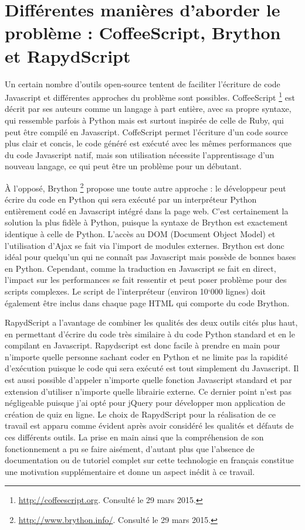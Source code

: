 \documentclass[a4paper,11pt,openany,oneside]{sphinxmanual}
\begin{document}
\section{Différentes manières d'aborder le problème : CoffeeScript, Brython et RapydScript}
\label{rapydscript:differentes-manieres-d-aborder-le-probleme-coffeescript-brython-et-rapydscript}
Un certain nombre d'outils open-source tentent de faciliter l'écriture de code Javascript et différentes approches du problème sont possibles. CoffeeScript \footnote{
\href{http://coffeescript.org}{http://coffeescript.org}. Consulté le 29 mars 2015.
} est décrit par ses auteurs comme un langage à part entière, avec sa propre syntaxe, qui ressemble parfois à Python mais est surtout inspirée de celle de Ruby, qui peut être compilé en Javascript. CoffeScript permet l'écriture d'un code source plus clair et concis, le code généré est exécuté avec les mêmes performances que du code Javascript natif, mais son utilisation nécessite l'apprentissage d'un nouveau langage, ce qui peut être un problème pour un débutant.

À l'opposé, Brython \footnote{
\href{http://www.brython.info/}{http://www.brython.info/}. Consulté le 29 mars 2015.
} propose une toute autre approche : le développeur peut écrire du code en Python qui sera exécuté par un interpréteur Python entièrement codé en Javascript intégré dans la page web. C'est certainement la solution la plus fidèle à Python, puisque la syntaxe de Brython est exactement identique à celle de Python. L'accès au DOM (Document Object Model) et l'utilisation d'Ajax se fait via l'import de modules externes. Brython est donc idéal pour quelqu'un qui ne connaît pas Javascript mais possède de bonnes bases en Python. Cependant, comme la traduction en Javascript se fait en direct, l'impact sur les performances se fait ressentir et peut poser problème pour des scripts complexes. Le script de l'interpréteur (environ 10`000 lignes) doit également être inclus dans chaque page HTML qui comporte du code Brython.

RapydScript a l'avantage de combiner les qualités des deux outils cités plus haut, en permettant d'écrire du code très similaire à du code Python standard et en le compilant en Javascript. Rapydscript est donc facile à prendre en main pour n'importe quelle personne sachant coder en Python et ne limite pas la rapidité d'exécution puisque le code qui sera exécuté est tout simplement du Javascript. Il est aussi possible d'appeler n'importe quelle fonction Javascript standard et par extension d'utiliser n'importe quelle librairie externe. Ce dernier point n'est pas négligeable puisque j'ai opté pour jQuery pour développer mon application de création de quiz en ligne. Le choix de RapydScript pour la réalisation de ce travail est apparu comme évident après avoir considéré les qualités et défauts de ces différents outils. La prise en main ainsi que la compréhension de son fonctionnement a pu se faire aisément, d'autant plus que l'absence de documentation ou de tutoriel complet sur cette technologie en français constitue une motivation supplémentaire et donne un aspect inédit à ce travail.
\end{document}
